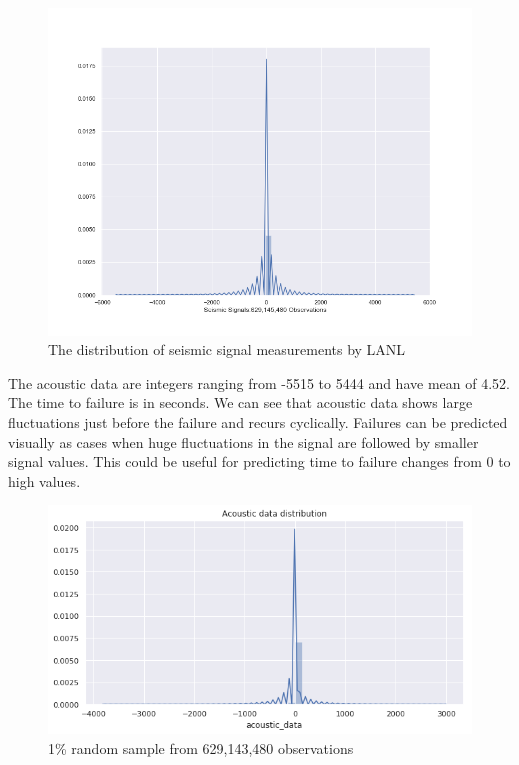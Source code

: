 \documentclass[]{llncs} %
\begin{document}
\begin{figure}
	\centering
	\includegraphics[width=.8\linewidth]{../GPUProject/acousticRand60000DistPlot}
	\caption{The distribution of seismic signal measurements by LANL}
	\label{fig:acousticRand60000DistPlot}
\end{figure}
The acoustic data are integers ranging from -5515 to 5444 and have mean of 4.52. The time to failure is in seconds. We can see that acoustic data shows large fluctuations just before the failure and recurs cyclically. Failures can be predicted visually as cases when huge fluctuations in the signal are followed by smaller signal values. This could be useful for predicting time to failure changes from 0 to high values.
\begin{figure}[h]
	\centering
	\includegraphics[width=0.7\linewidth]{../GPUProject/acousticFeatureIntegers}
	\caption[]{1\% random sample from 629,143,480 observations}
	\label{fig:acousticfeatureintegers}
\end{figure}
\end{document}
